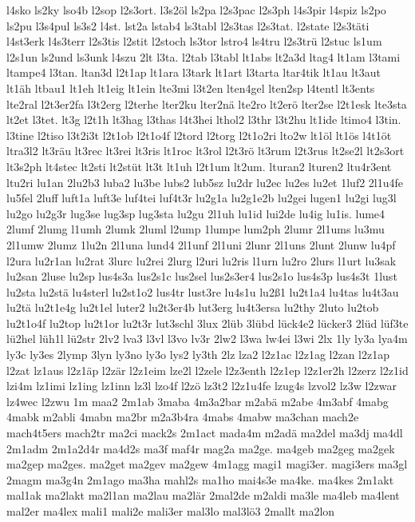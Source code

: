 {l4sko
ls2ky
lso4b
l2sop
l2s3ort.
l3s2öl
ls2pa
l2s3pac
l2s3ph
l4s3pir
l4spiz
ls2po
ls2pu
l3s4pul
ls3s2
l4st.
lst2a
lstab4
ls3tabl
l2s3tas
l2s3tat.
l2state
l2s3täti
l4st3erk
l4s3terr
l2s3tis
l2stit
l2stoch
ls3tor
lstro4
ls4tru
l2s3trü
l2stuc
ls1um
l2s1un
ls2und
ls3unk
l4szu
2lt
l3ta.
l2tab
l3tabl
lt1abs
lt2a3d
ltag4
lt1am
l3tami
ltampe4
l3tan.
ltan3d
l2t1ap
lt1ara
l3tark
lt1art
l3tarta
ltar4tik
lt1au
lt3aut
lt1äh
ltbau1
lt1eh
lt1eig
lt1ein
lte3mi
l3t2en
lten4gel
lten2sp
l4tentl
lt3ents
lte2ral
l2t3er2fa
l3t2erg
l2terhe
lter2ku
lter2nä
lte2ro
lt2erö
lter2se
l2t1esk
lte3sta
lt2et
l3tet.
lt3g
l2t1h
lt3hag
l3thas
l4t3hei
lthol2
l3thr
l3t2hu
lt1ide
ltimo4
l3tin.
l3tine
l2tiso
l3t2i3t
l2t1ob
l2t1o4f
l2tord
l2torg
l2t1o2ri
lto2w
lt1öl
lt1ös
l4t1öt
ltra3l2
lt3räu
lt3rec
lt3rei
lt3ris
lt1roc
lt3rol
l2t3rö
lt3rum
l2t3rus
lt2se2l
lt2s3ort
lt3s2ph
lt4stec
lt2sti
lt2stüt
lt3t
lt1uh
l2t1um
lt2um.
lturan2
lturen2
ltu4r3ent
ltu2ri
lu1an
2lu2b3
luba2
lu3be
lubs2
lub5sz
lu2dr
lu2ec
lu2es
lu2et
1luf2
2l1u4fe
lu5fel
2luff
luft1a
luft3e
luf4tei
luf4t3r
lu2g1a
lu2g1e2b
lu2gei
lugen1
lu2gi
lug3l
lu2go
lu2g3r
lug3se
lug3sp
lug3sta
lu2gu
2l1uh
lu1id
lui2de
lu4ig
lu1is.
lume4
2lumf
2lumg
l1umh
2lumk
2luml
l2ump
1lumpe
lum2ph
2lumr
2l1ums
lu3mu
2l1umw
2lumz
1lu2n
2l1una
lund4
2l1unf
2l1uni
2lunr
2l1uns
2lunt
2lunw
lu4pf
l2ura
lu2r1an
lu2rat
3lurc
lu2rei
2lurg
l2uri
lu2ris
l1urn
lu2ro
2lurs
l1urt
lu3sak
lu2san
2luse
lu2sp
lus4s3a
lus2s1c
lus2sel
lus2s3er4
lus2s1o
lus4s3p
lus4s3t
1lust
lu2sta
lu2stä
lu4sterl
lu2st1o2
lus4tr
lust3re
lu4s1u
lu2ß1
lu2t1a4
lu4tas
lu4t3au
lu2tä
lu2t1e4g
lu2t1el
luter2
lu2t3er4b
lut3erg
lu4t3ersa
lu2thy
2luto
lu2tob
lu2t1o4f
lu2top
lu2t1or
lu2t3r
lut3schl
3lux
2lüb
3lübd
lück4e2
lücker3
2lüd
lüf3te
lü2hel
lüh1l
lü2str
2lv2
lva3
l3vl
l3vo
lv3r
2lw2
l3wa
lw4ei
l3wi
2lx
1ly
ly3a
lya4m
ly3c
ly3es
2lymp
3lyn
ly3no
ly3o
lys2
ly3th
2lz
lza2
l2z1ac
l2z1ag
l2zan
l2z1ap
l2zat
lz1aus
l2z1äp
l2zär
l2z1eim
lze2l
l2zele
l2z3enth
l2z1ep
l2z1er2h
l2zerz
l2z1id
lzi4m
lz1imi
lz1ing
lz1inn
lz3l
lzo4f
l2zö
lz3t2
l2z1u4fe
lzug4s
lzvol2
lz3w
l2zwar
lz4wec
l2zwu
1m
maa2
2m1ab
3maba
4m3a2bar
m2abä
m2abe
4m3abf
4mabg
4mabk
m2abli
4mabn
ma2br
m2a3b4ra
4mabs
4mabw
ma3chan
mach2e
mach4t5ers
mach2tr
ma2ci
mack2s
2m1act
mada4m
m2adä
ma2del
ma3dj
ma4dl
2m1adm
2m1a2d4r
ma4d2s
ma3f
maf4r
mag2a
ma2ge.
ma4geb
ma2geg
ma2gek
ma2gep
ma2ges.
ma2get
ma2gev
ma2gew
4m1agg
magi1
magi3er.
magi3ers
ma3gl
2magm
ma3g4n
2m1ago
ma3ha
mahl2s
ma1ho
mai4s3e
ma4ke.
ma4kes
2m1akt
mal1ak
ma2lakt
ma2l1an
ma2lau
ma2lär
2mal2de
m2aldi
ma3le
ma4leb
ma4lent
mal2er
ma4lex
mali1
mali2e
mali3er
mal3lo
mal3lö3
2mallt
ma2lon
}
